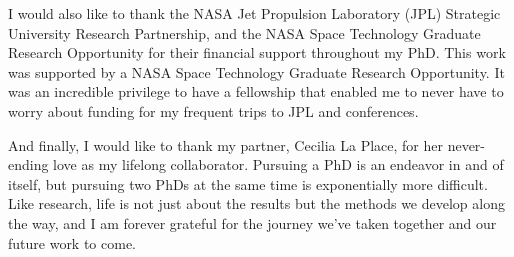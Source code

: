 I would also like to thank the NASA Jet Propulsion Laboratory (JPL) Strategic University Research Partnership, and the NASA Space Technology Graduate Research Opportunity for their financial support throughout my PhD. 
This work was supported by a NASA Space Technology Graduate Research Opportunity. 
It was an incredible privilege to have a fellowship that enabled me to never have to worry about funding for my frequent trips to JPL and conferences.

And finally, I would like to thank my partner, Cecilia La Place, for her never-ending love as my lifelong collaborator. 
Pursuing a PhD is an endeavor in and of itself, but pursuing two PhDs at the same time is exponentially more difficult.
Like research, life is not just about the results but the methods we develop along the way, and I am forever grateful for the journey we've taken together and our future work to come.